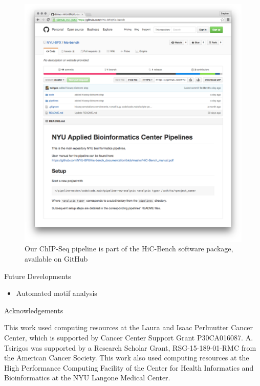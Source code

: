 \documentclass[final]{beamer}
\newlength{\onecolwid}
\begin{document}
\begin{frame}[t]
\begin{columns}[t]
\begin{column}{\onecolwid}
\begin{figure}
\includegraphics[width=1.0\linewidth]{./Figures/github_repo}
\caption{Our ChIP-Seq pipeline is part of the HiC-Bench software package, available on GitHub}
\label{fig:github_repo}
\end{figure}

\vspace{2.5cm}
\begin{beamerboxesrounded}{Future Developments}
\begin{itemize}
\item Automated motif analysis
\end{itemize}
\end{beamerboxesrounded}\hfill

\begin{beamerboxesrounded}{Acknowledgements}

This work used computing resources at the Laura and Isaac Perlmutter Cancer Center, which is supported by Cancer Center Support Grant P30CA016087.
A. Tsirigos was supported by a Research Scholar Grant, RSG-15-189-01-RMC
from the American Cancer Society. 
This work also used computing resources at the High Performance Computing Facility of the Center for Health Informatics and Bioinformatics at the NYU Langone Medical Center. \\


\end{beamerboxesrounded}
\end{column}
\end{columns}
\end{frame}
\end{document}
